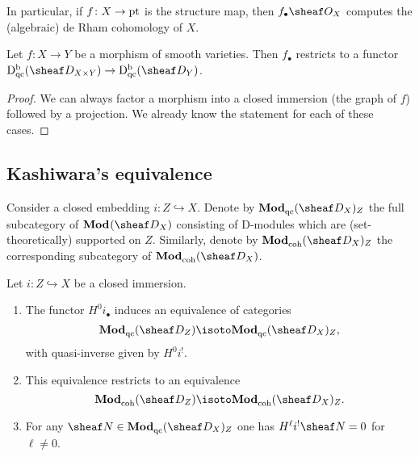 \documentclass[number-in-sections,a4paper]{notes}
\begin{document}
\begin{Remark}
    In particular, if $f\colon X \to \mathrm{pt}$ is the structure map, then $f_\bullet\sO_X$ computes the (algebraic) de Rham cohomology of $X$.
\end{Remark}

\begin{Corollary}
    Let $f\colon X \to Y$ be a morphism of smooth varieties.
    Then $f_\bullet$ restricts to a functor $\catDbDModqc{X \times Y} \to \catDbDModqc{Y}$.
\end{Corollary}

\begin{proof}
    We can always factor a morphism into a closed immersion (the graph of $f$) followed by a projection.
    We already know the statement for each of these cases.
\end{proof}

\subsection{Kashiwara's equivalence}

Consider a closed embedding $i \colon Z \hookrightarrow X$.
Denote by $\catDModqc{X}_Z$ the full subcategory of $\catDMod{X}$ consisting of D-modules which are (set-theoretically) supported on $Z$.
Similarly, denote by $\catDModcoh{X}_Z$ the corresponding subcategory of $\catDModcoh{X}$.

\begin{Theorem}\label{thm:KashiwarasEquivalence-abelian}
    Let $i\colon Z \hookrightarrow X$ be a closed immersion.
    \begin{enumerate}
        \item\label{it:thm:KashiwarasEquivalence:1}The functor $H^0i_\bullet$ induces an equivalence of categories
            \[
                \catDModqc{Z} \isoto \catDModqc{X}_Z,
            \]
            with quasi-inverse given by $H^0i^!$.
        \item\label{it:thm:KashiwarasEquivalence:2} This equivalence restricts to an equivalence
            \[
                \catDModcoh{Z} \isoto \catDModcoh{X}_Z.
            \]
        \item\label{it:thm:KashiwarasEquivalence:3} For any $\sheaf N \in \catDModqc{X}_Z$ one has $H^\ell i^!\sheaf N = 0$ for $\ell \ne 0$.
    \end{enumerate}
\end{Theorem}
\end{document}
